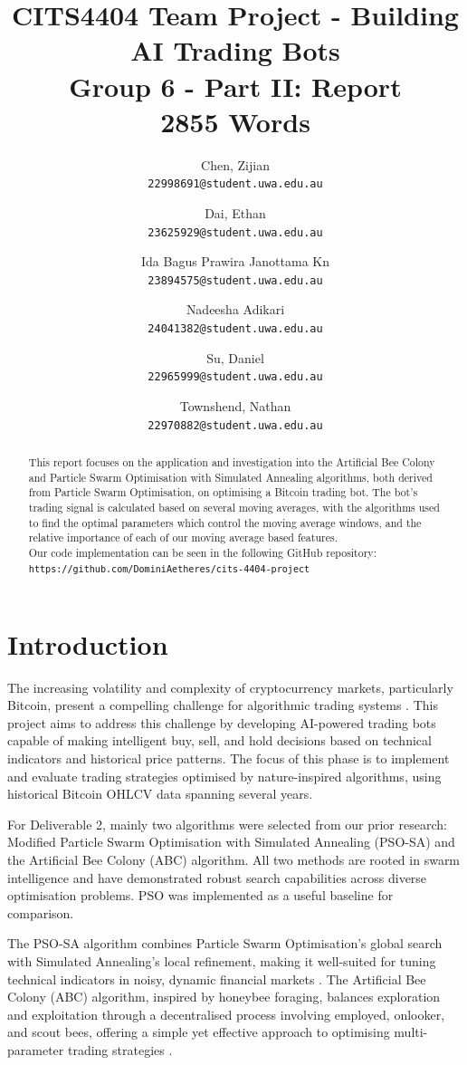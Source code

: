 \documentclass[a4paper, 12pt]{extarticle}
\title{
    CITS4404 Team Project - Building AI Trading Bots
    \\ \large Group 6 - Part II: Report
    \\ 2855 Words
}
\author{
    Chen, Zijian\\
    \normalsize \texttt{22998691@student.uwa.edu.au}
    \and
    Dai, Ethan\\
    \normalsize \texttt{23625929@student.uwa.edu.au}
    \and
    Ida Bagus Prawira Janottama Kn\\
    \normalsize \texttt{23894575@student.uwa.edu.au}
    \and
    Nadeesha Adikari\\
    \normalsize \texttt{24041382@student.uwa.edu.au}
    \and
    Su, Daniel\\
    \normalsize \texttt{22965999@student.uwa.edu.au}
    \and
    Townshend, Nathan\\
    \normalsize \texttt{22970882@student.uwa.edu.au}
}
\date{}
\begin{document}
\maketitle

\begin{abstract}
    \noindent
    This report focuses on the application and investigation into the Artificial Bee Colony and Particle Swarm Optimisation with Simulated Annealing algorithms, both derived from Particle Swarm Optimisation, on optimising a Bitcoin trading bot. The bot's trading signal is calculated based on several moving averages, with the algorithms used to find the optimal parameters which control the moving average windows, and the relative importance of each of our moving average based features.\\
    
    \noindent
    Our code implementation can be seen in the following GitHub repository:\\ \texttt{https://github.com/DominiAetheres/cits-4404-project}
\end{abstract}

\newpage
\tableofcontents
\newpage

\section{Introduction}
The increasing volatility and complexity of cryptocurrency markets, particularly Bitcoin, present a compelling challenge for algorithmic trading systems \cite{dakalbab2024artificial}. This project aims to address this challenge by developing AI-powered trading bots capable of making intelligent buy, sell, and hold decisions based on technical indicators and historical price patterns. The focus of this phase is to implement and evaluate trading strategies optimised by nature-inspired algorithms, using historical Bitcoin OHLCV data spanning several years. 

For Deliverable 2, mainly two algorithms were selected from our prior research:  Modified Particle Swarm Optimisation with Simulated Annealing (PSO-SA) and the Artificial Bee Colony (ABC) algorithm. All two methods are rooted in swarm intelligence and have demonstrated robust search capabilities across diverse optimisation problems. PSO was implemented as a useful baseline for comparison. 

The PSO-SA algorithm combines Particle Swarm Optimisation's global search with Simulated Annealing's local refinement, making it well-suited for tuning technical indicators in noisy, dynamic financial markets \cite{psosa}. The Artificial Bee Colony (ABC) algorithm, inspired by honeybee foraging, balances exploration and exploitation through a decentralised process involving employed, onlooker, and scout bees, offering a simple yet effective approach to optimising multi-parameter trading strategies \cite{abc}. 
\end{document}
